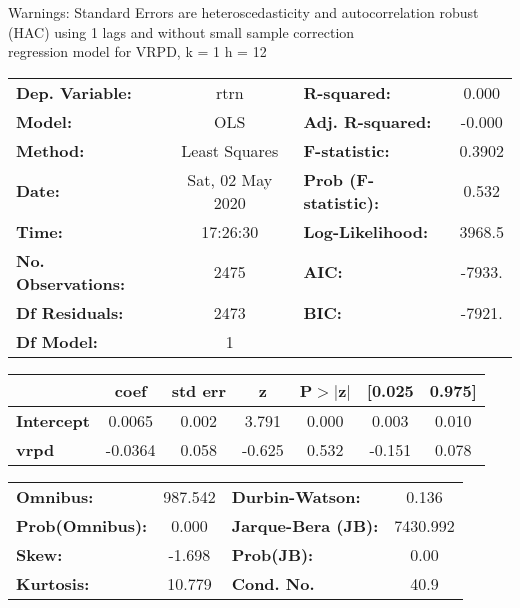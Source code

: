 Warnings: \newline
 [1] Standard Errors are heteroscedasticity and autocorrelation robust (HAC) using 1 lags and without small sample correction\\ 

regression model for VRPD, k = 1 h = 12\begin{center}
\begin{tabular}{lclc}
\toprule
\textbf{Dep. Variable:}    &       rtrn       & \textbf{  R-squared:         } &     0.000   \\
\textbf{Model:}            &       OLS        & \textbf{  Adj. R-squared:    } &    -0.000   \\
\textbf{Method:}           &  Least Squares   & \textbf{  F-statistic:       } &    0.3902   \\
\textbf{Date:}             & Sat, 02 May 2020 & \textbf{  Prob (F-statistic):} &    0.532    \\
\textbf{Time:}             &     17:26:30     & \textbf{  Log-Likelihood:    } &    3968.5   \\
\textbf{No. Observations:} &        2475      & \textbf{  AIC:               } &    -7933.   \\
\textbf{Df Residuals:}     &        2473      & \textbf{  BIC:               } &    -7921.   \\
\textbf{Df Model:}         &           1      & \textbf{                     } &             \\
\bottomrule
\end{tabular}
\begin{tabular}{lcccccc}
                   & \textbf{coef} & \textbf{std err} & \textbf{z} & \textbf{P$> |$z$|$} & \textbf{[0.025} & \textbf{0.975]}  \\
\midrule
\textbf{Intercept} &       0.0065  &        0.002     &     3.791  &         0.000        &        0.003    &        0.010     \\
\textbf{vrpd}      &      -0.0364  &        0.058     &    -0.625  &         0.532        &       -0.151    &        0.078     \\
\bottomrule
\end{tabular}
\begin{tabular}{lclc}
\textbf{Omnibus:}       & 987.542 & \textbf{  Durbin-Watson:     } &    0.136  \\
\textbf{Prob(Omnibus):} &   0.000 & \textbf{  Jarque-Bera (JB):  } & 7430.992  \\
\textbf{Skew:}          &  -1.698 & \textbf{  Prob(JB):          } &     0.00  \\
\textbf{Kurtosis:}      &  10.779 & \textbf{  Cond. No.          } &     40.9  \\
\bottomrule
\end{tabular}
\end{center}


